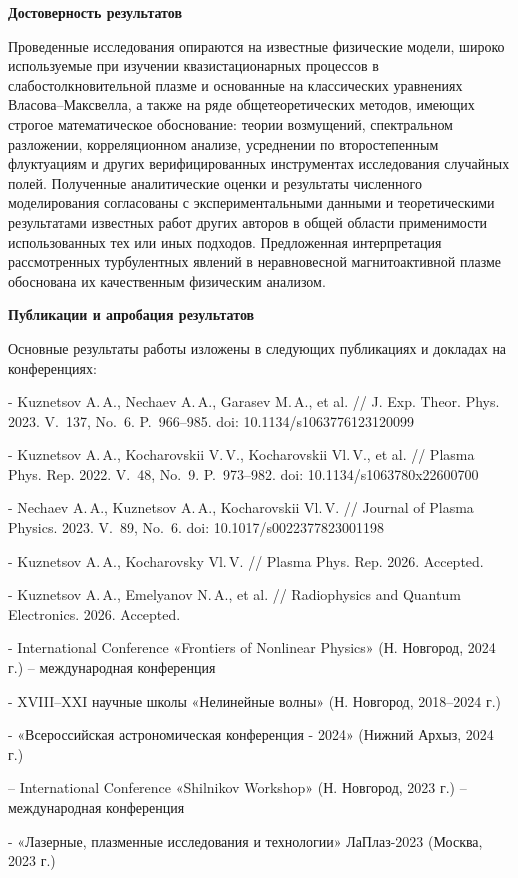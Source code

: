{\bfseries Достоверность результатов}

Проведенные исследования опираются на известные физические модели, широко используемые при изучении квазистационарных процессов в слабостолкновительной плазме и основанные на классических уравнениях Власова–Максвелла, а также на ряде общетеоретических методов, имеющих строгое математическое обоснование: теории возмущений, спектральном разложении, корреляционном анализе, усреднении по второстепенным флуктуациям и других верифицированных инструментах исследования случайных полей. Полученные аналитические оценки и результаты численного моделирования согласованы с экспериментальными данными и теоретическими результатами известных работ других авторов в общей области применимости использованных тех или иных подходов. Предложенная интерпретация рассмотренных турбулентных явлений в неравновесной магнитоактивной плазме обоснована их качественным физическим анализом.


{\bfseries Публикации и апробация результатов}

Основные результаты работы изложены в следующих публикациях и докладах на конференциях:

- Kuznetsov A.\,A., Nechaev A.\,A., Garasev M.\,A., et al. // J. Exp. Theor. Phys. 2023. V.~137, No.~6. P.~966--985. doi: 10.1134/s1063776123120099

- Kuznetsov A.\,A., Kocharovskii V.\,V., Kocharovskii Vl.\,V., et al. // Plasma Phys. Rep. 2022. V.~48, No.~9. P.~973--982. doi: 10.1134/s1063780x22600700

- Nechaev  A.\,A., Kuznetsov A.\,A., Kocharovskii Vl.\,V. // Journal of Plasma Physics. 2023. V.~89, No.~6. doi: 10.1017/s0022377823001198

- Kuznetsov A.\,A., Kocharovsky Vl.\,V. // Plasma Phys. Rep. 2026. Accepted.

- Kuznetsov A.\,A., Emelyanov N.\,A., et al. // Radiophysics and Quantum Electronics. 2026. Accepted.


- International Conference «Frontiers of Nonlinear Physics» (Н. Новгород, 2024 г.) – международная конференция 

- XVIII–XXI научные школы «Нелинейные волны» (Н. Новгород, 2018–2024 г.)

- «Всероссийская астрономическая конференция - 2024» (Нижний Архыз, 2024 г.)

– International Conference «Shilnikov Workshop» (Н. Новгород, 2023 г.) – международная конференция 

- «Лазерные, плазменные исследования и технологии» ЛаПлаз-2023 (Москва, 2023 г.)

